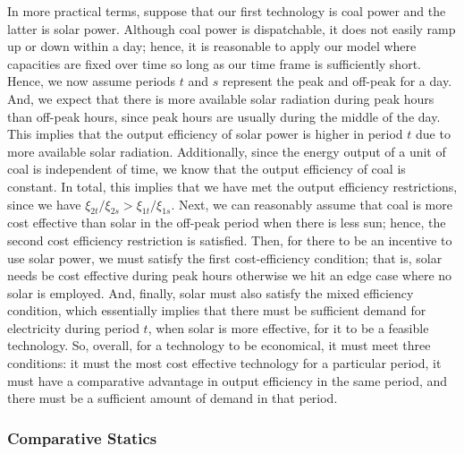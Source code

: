 \documentclass[11pt,a4paper,leqno]{extarticle}
\begin{document}
	
	
	In more practical terms, suppose that our first technology is coal power and the latter is solar power. Although coal power is dispatchable, it does not easily ramp up or down within a day; hence, it is reasonable to apply our model where capacities are fixed over time so long as our time frame is sufficiently short. Hence, we now assume periods $t$ and $s$ represent the peak and off-peak for a day. And, we expect that there is more available solar radiation during peak hours than off-peak hours, since peak hours are usually during the middle of the day. This implies that the output efficiency of solar power is higher in period $t$ due to more available solar radiation. Additionally, since the energy output of a unit of coal is independent of time, we know that the output efficiency of coal is constant. In total, this implies that we have met the output efficiency restrictions, since we have $\xi_{2t}/\xi_{2s} > \xi_{1t}/\xi_{1s}$. Next, we can reasonably assume that coal is more cost effective than solar in the off-peak period when there is less sun; hence, the second cost efficiency restriction is satisfied. Then, for there to be an incentive to use solar power, we must satisfy the first cost-efficiency condition; that is, solar needs be cost effective during peak hours otherwise we hit an edge case where no solar is employed. And, finally, solar must also satisfy the mixed efficiency condition, which essentially implies that there must be sufficient demand for electricity during period $t$, when solar is more effective, for it to be a feasible technology. So, overall, for a technology to be economical, it must meet three conditions: it must the most cost effective technology for a particular period, it must have a comparative advantage in output efficiency in the same period, and there must be a sufficient amount of demand in that period. 
	
	
	
	\subsubsection{Comparative Statics}
	
\end{document}
